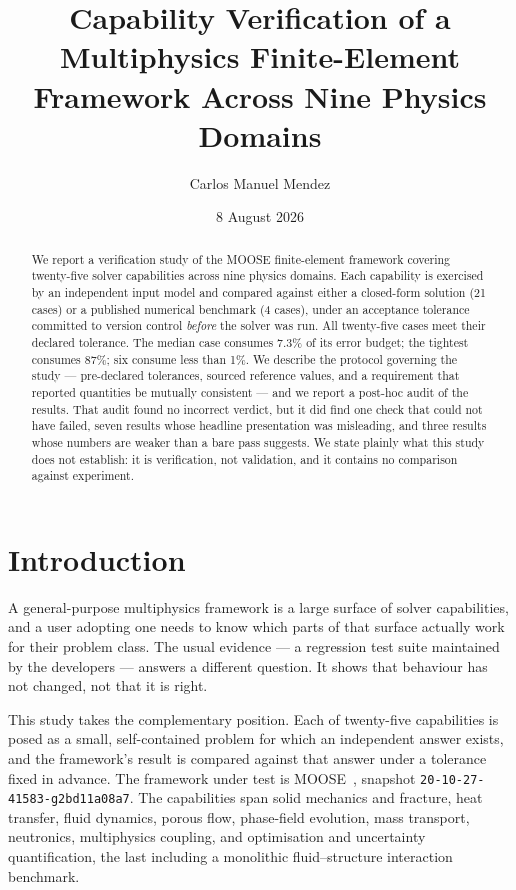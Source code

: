 \documentclass[11pt,a4paper]{article}
\title{\bfseries Capability Verification of a Multiphysics Finite-Element\\
Framework Across Nine Physics Domains}
\author{Carlos Manuel Mendez}
\date{8 August 2026}
\begin{document}
\maketitle

\begin{abstract}
\noindent
We report a verification study of the MOOSE finite-element framework covering
twenty-five solver capabilities across nine physics domains. Each capability is
exercised by an independent input model and compared against either a
closed-form solution (21 cases) or a published numerical benchmark (4 cases),
under an acceptance tolerance committed to version control \emph{before} the
solver was run. All twenty-five cases meet their declared tolerance. The median
case consumes 7.3\% of its error budget; the tightest consumes 87\%; six consume
less than 1\%. We describe the protocol governing the study --- pre-declared
tolerances, sourced reference values, and a requirement that reported quantities
be mutually consistent --- and we report a post-hoc audit of the results. That audit found no incorrect verdict, but it did find one check that
could not have failed, seven results whose headline presentation was misleading,
and three results whose numbers are weaker than a bare pass suggests. We state
plainly what this study does not establish: it is verification, not validation,
and it contains no comparison against experiment.
\end{abstract}

\section{Introduction}

A general-purpose multiphysics framework is a large surface of solver
capabilities, and a user adopting one needs to know which parts of that surface
actually work for their problem class. The usual evidence --- a regression test
suite maintained by the developers --- answers a different question. It shows
that behaviour has not changed, not that it is right.

This study takes the complementary position. Each of twenty-five capabilities is
posed as a small, self-contained problem for which an independent answer exists,
and the framework's result is compared against that answer under a tolerance
fixed in advance. The framework under test is
MOOSE~\cite{permann2020}, snapshot \texttt{20-10-27-41583-g2bd11a08a7}. The
capabilities span solid mechanics and fracture, heat transfer, fluid dynamics,
porous flow, phase-field evolution, mass transport, neutronics, multiphysics
coupling, and optimisation and uncertainty quantification, the last including a monolithic
fluid--structure interaction benchmark.
\end{document}
